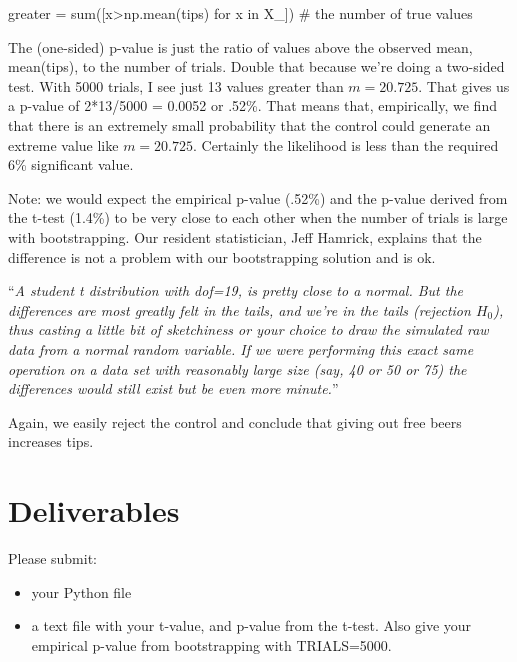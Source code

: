 \begin{fullwidth}
\begin{pyverbatim}
greater = sum([x>np.mean(tips) for x in X_]) # the number of true values
\end{pyverbatim}

\step The (one-sided) p-value is just the ratio of values above the observed mean, mean(tips), to the number of trials. Double that because we're doing a two-sided test. With 5000 trials, I see just 13 values greater than $m=20.725$. That gives us a p-value of 2*13/5000 = 0.0052 or .52\%. That means that, empirically, we find that there is an extremely small probability that the control could generate an extreme value like $m=20.725$. Certainly the likelihood is less than the required 6\% significant value. 

Note: we would expect the empirical p-value (.52\%) and the p-value derived from the t-test (1.4\%) to be very close to each other when the number of trials is large with bootstrapping.  Our resident statistician, Jeff Hamrick, explains that the difference is not a problem with our bootstrapping solution and is ok.

``{\em A student t distribution with dof=19, is pretty close to a normal. But the differences are most greatly felt in the tails, and we're in the tails (rejection $H_{0}$), thus casting a little bit of sketchiness or your choice to draw the simulated raw data from a normal random variable. If we were performing this exact same operation on a data set with reasonably large size (say, 40 or 50 or 75) the differences would still exist but be even more minute.}''

Again, we easily reject the control and conclude that giving out free beers increases tips.

\section{Deliverables}

Please submit:

\begin{itemize}
\item your Python file
\item a text file with your t-value, and p-value from the t-test. Also give your empirical p-value from bootstrapping with TRIALS=5000.
\end{itemize}

\end{fullwidth}
